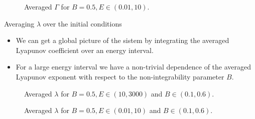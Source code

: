 \documentclass{beamer}
\begin{document}

\begin{frame}
	\begin{figure}
		
		\caption{Averaged \(\Gamma\) for \(B=0.5, E \in (0.01, 10)\).}
	\end{figure}
\end{frame}


\begin{frame}{Averaging \(\lambda\) over the initial conditions}
	\begin{itemize}
		\item We can get a global picture of the sistem by integrating
		the averaged Lyapunov coefficient over an energy interval.
		\item For a large energy interval we have a non-trivial
		dependence of the averaged Lyapunov exponent with respect
		to the non-integrability parameter $B$.
	\end{itemize}
\end{frame}


\begin{frame}
	\begin{figure}
		
		\caption{Averaged \(\lambda\) for \(B=0.5, E \in (10, 3000)\)
		and \(B \in (0.1, 0.6)\).}
	\end{figure}
\end{frame}


\begin{frame}
	\begin{figure}
		
		\caption{Averaged \(\lambda\) for \(B=0.5, E \in (0.01, 10)\)
		and \(B \in (0.1, 0.6)\).}
	\end{figure}
\end{frame}


% 		
\end{document}
